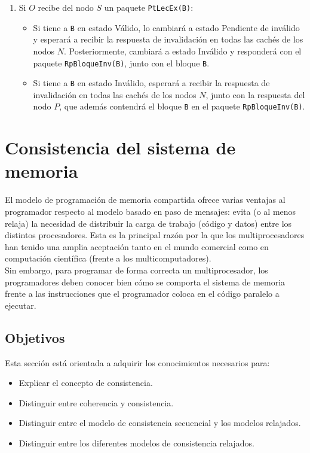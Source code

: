 \begin{enumerate}
\begin{enumerate}
\begin{itemize}
            \end{itemize}
        \item Si $O$ recibe del nodo $S$ un paquete \verb|PtLecEx(B)|:
            \begin{itemize}
                \item Si tiene a \verb|B| en estado Válido, lo cambiará a estado Pendiente de inválido y esperará a recibir la respuesta de invalidación en todas las cachés de los nodos $N$. Posteriormente, cambiará a estado Inválido y responderá con el paquete \verb|RpBloqueInv(B)|, junto con el bloque \verb|B|.
                \item Si tiene a \verb|B| en estado Inválido, esperará a recibir la respuesta de invalidación en todas las cachés de los nodos $N$, junto con la respuesta del nodo $P$, que además contendrá el bloque \verb|B| en el paquete \verb|RpBloqueInv(B)|.
            \end{itemize}
    \end{enumerate}
\end{enumerate}

\newpage
\section{Consistencia del sistema de memoria}
El modelo de programación de memoria compartida ofrece varias ventajas al programador respecto al modelo basado en paso de mensajes: evita (o al menos relaja) la necesidad de distribuir la carga de trabajo (código y datos) entre los distintos procesadores. Esta es la principal razón por la que los multiprocesadores han tenido una amplia aceptación tanto en el mundo comercial como en computación científica (frente a los multicomputadores).\\

Sin embargo, para programar de forma correcta un multiprocesador, los programadores deben conocer bien cómo se comporta el sistema de memoria frente a las instrucciones que el programador coloca en el código paralelo a ejecutar.

\subsection{Objetivos}
Esta sección está orientada a adquirir los conocimientos necesarios para:
\begin{itemize}
    \item Explicar el concepto de consistencia.
    \item Distinguir entre coherencia y consistencia.
    \item Distinguir entre el modelo de consistencia secuencial y los modelos relajados.
    \item Distinguir entre los diferentes modelos de consistencia relajados.
\end{itemize}

